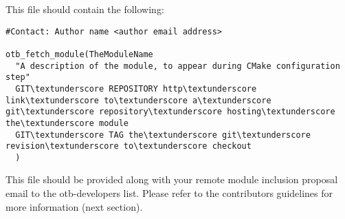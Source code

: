 This file should contain the following: 

\begin{verbatim}
#Contact: Author name <author email address>

otb_fetch_module(TheModuleName
  "A description of the module, to appear during CMake configuration step"
  GIT\textunderscore REPOSITORY http\textunderscore link\textunderscore to\textunderscore a\textunderscore git\textunderscore repository\textunderscore hosting\textunderscore the\textunderscore module
  GIT\textunderscore TAG the\textunderscore git\textunderscore revision\textunderscore to\textunderscore checkout
  )
\end{verbatim}
This file should be provided along with your remote module inclusion proposal email to the otb-developers list. Please refer to the contributors guidelines for more information (next section). 

